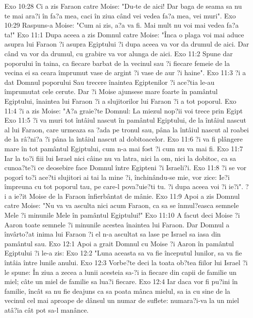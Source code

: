 Exo 10:28  Ci a zis Faraon catre Moise: "Du-te de aici! Dar baga de seama sa nu te mai ara?i în fa?a mea, caci în ziua când vei vedea fa?a mea, vei muri".
Exo 10:29  Raspuns-a Moise: "Cum ai zis, a?a va fi. Mai mult nu voi mai vedea fa?a ta!"
Exo 11:1  Dupa aceea a zis Domnul catre Moise: "Înca o plaga voi mai aduce asupra lui Faraon ?i asupra Egiptului ?i dupa aceea va vor da drumul de aici. Dar când va vor da drumul, cu grabire va vor alunga de aici.
Exo 11:2  Spune dar poporului în taina, ca fiecare barbat de la vecinul sau ?i fiecare femeie de la vecina ei sa ceara împrumut vase de argint ?i vase de aur ?i haine".
Exo 11:3  ?i a dat Domnul poporului Sau trecere înaintea Egiptenilor ?i ace?tia le-au împrumutat cele cerute. Dar ?i Moise ajunsese mare foarte în pamântul Egiptului, înaintea lui Faraon ?i a slujitorilor lui Faraon ?i a tot poporul.
Exo 11:4  ?i a zis Moise: "A?a graie?te Domnul: La miezul nop?ii voi trece prin Egipt
Exo 11:5  ?i va muri tot întâiul nascut în pamântul Egiptului, de la întâiul nascut al lui Faraon, care urmeaza sa ?ada pe tronul sau, pâna la întâiul nascut al roabei de la râ?ni?a ?i pâna la întâiul nascut al dobitoacelor.
Exo 11:6  ?i va fi plângere mare în tot pamântul Egiptului, cum n-a mai fost ?i cum nu va mai fi.
Exo 11:7  Iar la to?i fiii lui Israel nici câine nu va latra, nici la om, nici la dobitoc, ca sa cunoa?te?i ce deosebire face Domnul între Egipteni ?i Israeli?i.
Exo 11:8  ?i se vor pogorî to?i ace?ti slujitori ai tai la mine ?i, închinându-se mie, vor zice: Ie?i împreuna cu tot poporul tau, pe care-l pova?uie?ti tu. ?i dupa aceea voi ?i ie?i". ?i a ie?it Moise de la Faraon înfierbântat de mânie.
Exo 11:9  Apoi a zis Domnul catre Moise: "Nu va va asculta nici acum Faraon, ca sa se înmul?easca semnele Mele ?i minunile Mele în pamântul Egiptului!"
Exo 11:10  A facut deci Moise ?i Aaron toate semnele ?i minunile acestea înaintea lui Faraon. Dar Domnul a învârto?at inima lui Faraon ?i el n-a ascultat sa lase pe Israel sa iasa din pamântul sau.
Exo 12:1  Apoi a grait Domnul cu Moise ?i Aaron în pamântul Egiptului ?i le-a zis:
Exo 12:2  "Luna aceasta sa va fie începutul lunilor, sa va fie întâia între lunile anului.
Exo 12:3  Vorbe?te deci la toata ob?tea fiilor lui Israel ?i le spune: În ziua a zecea a lunii acesteia sa-?i ia fiecare din capii de familie un miel; câte un miel de familie sa lua?i fiecare.
Exo 12:4  Iar daca vor fi pu?ini în familie, încât sa nu fie deajuns ca sa poata mânca mielul, sa ia cu sine de la vecinul cel mai aproape de dânsul un numar de suflete: numara?i-va la un miel atâ?ia cât pot sa-l manânce.
